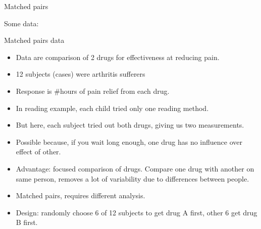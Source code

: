 \documentclass[ignorenonframetext,]{beamer}
\providecommand{\tightlist}{%
  \setlength{\itemsep}{0pt}\setlength{\parskip}{0pt}}
\begin{document}
\begin{frame}{Matched pairs}
\protect\hypertarget{matched-pairs}{}

Some data:


\end{frame}

\begin{frame}{Matched pairs data}
\protect\hypertarget{matched-pairs-data}{}

\begin{itemize}
\tightlist
\item
  Data are comparison of 2 drugs for effectiveness at reducing pain.
\item
  12 subjects (cases) were arthritis sufferers
\item
  Response is \#hours of pain relief from each drug.
\item
  In reading example, each child tried only one reading method.
\item
  But here, each subject tried out both drugs, giving us two
  measurements.
\item
  Possible because, if you wait long enough, one drug has no influence
  over effect of other.
\item
  Advantage: focused comparison of drugs. Compare one drug with another
  on same person, removes a lot of variability due to differences
  between people.
\item
  Matched pairs, requires different analysis.
\item
  Design: randomly choose 6 of 12 subjects to get drug A first, other 6
  get drug B first.
\end{itemize}

\end{frame}
\end{document}
